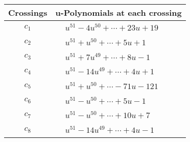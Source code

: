 \documentclass[1p]{elsarticle_modified}
\theoremstyle{definition}
\begin{document}
\begin{tabular}{m{50pt}|m{274pt}}
Crossings & \hspace{64pt}u-Polynomials at each crossing \\
\hline $$\begin{aligned}c_{1}\end{aligned}$$&$\begin{aligned}
&u^{51}-4 u^{50}+\cdots+23 u+19
\end{aligned}$\\
\hline $$\begin{aligned}c_{2}\end{aligned}$$&$\begin{aligned}
&u^{51}+u^{50}+\cdots+5 u+1
\end{aligned}$\\
\hline $$\begin{aligned}c_{3}\end{aligned}$$&$\begin{aligned}
&u^{51}+7 u^{49}+\cdots+8 u-1
\end{aligned}$\\
\hline $$\begin{aligned}c_{4}\end{aligned}$$&$\begin{aligned}
&u^{51}-14 u^{49}+\cdots+4 u+1
\end{aligned}$\\
\hline $$\begin{aligned}c_{5}\end{aligned}$$&$\begin{aligned}
&u^{51}+u^{50}+\cdots-71 u-121
\end{aligned}$\\
\hline $$\begin{aligned}c_{6}\end{aligned}$$&$\begin{aligned}
&u^{51}- u^{50}+\cdots+5 u-1
\end{aligned}$\\
\hline $$\begin{aligned}c_{7}\end{aligned}$$&$\begin{aligned}
&u^{51}- u^{50}+\cdots+10 u+7
\end{aligned}$\\
\hline $$\begin{aligned}c_{8}\end{aligned}$$&$\begin{aligned}
&u^{51}-14 u^{49}+\cdots+4 u-1
\end{aligned}$\\

\end{tabular}
\end{document}
